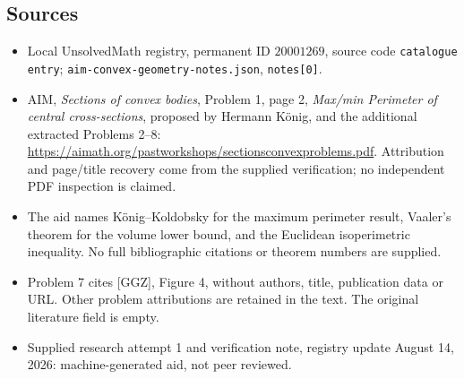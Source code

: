 \documentclass[11pt]{article}
\begin{document}
\subsection{Sources}
\begin{itemize}
\item Local UnsolvedMath registry, permanent ID \(20001269\), source code \texttt{catalogue entry}; \texttt{aim-convex-geometry-notes.json}, \texttt{notes[0]}.
\item AIM, \emph{Sections of convex bodies}, Problem 1, page 2, \emph{Max/min Perimeter of central cross-sections}, proposed by Hermann K\"onig, and the additional extracted Problems 2--8: \url{https://aimath.org/pastworkshops/sectionsconvexproblems.pdf}. Attribution and page/title recovery come from the supplied verification; no independent PDF inspection is claimed.
\item The aid names K\"onig--Koldobsky for the maximum perimeter result, Vaaler's theorem for the volume lower bound, and the Euclidean isoperimetric inequality. No full bibliographic citations or theorem numbers are supplied.
\item Problem 7 cites [GGZ], Figure 4, without authors, title, publication data or URL. Other problem attributions are retained in the text. The original literature field is empty.
\item Supplied research attempt 1 and verification note, registry update August 14, 2026: machine-generated aid, not peer reviewed.
\end{itemize}
\end{document}
